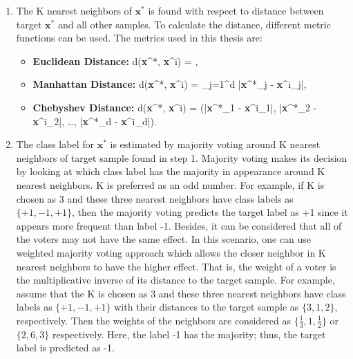 \begin{enumerate}
	\item The K nearest neighbors of $\textbf{x}^{*}$ is found with respect to distance between target $\textbf{x}^{*}$ and all other samples. To calculate the distance, different metric functions can be used. The metrics used in this thesis are:
	
	\begin{itemize}
		\item \textbf{Euclidean Distance:}
		\be
		\label{eucledian_distance}
		d(\textbf{x}^{*}, \textbf{x}^{i}) = \:,
		\ee
		
		\item \textbf{Manhattan Distance:}
		\be
		\label{manhattan_distance}
		d(\textbf{x}^{*}, \textbf{x}^{i}) = \sum_{j=1}^{d} |{\textbf{x}^{*}}_{j} - {\textbf{x}^{i}}_{j}|\:, \quad {}
		\ee
		
		\item \textbf{Chebyshev Distance:}
		\be
		\label{chebyshev_distance}
		d(\textbf{x}^{*}, \textbf{x}^{i}) = \max (|{\textbf{x}^{*}}_{1} - {\textbf{x}^{i}}_{1}|, |{\textbf{x}^{*}}_{2} - {\textbf{x}^{i}}_{2}|, \dots, |{\textbf{x}^{*}}_{d} - {\textbf{x}^{i}}_{d}|)\:.
		\ee
	\end{itemize}
	
	\item The class label for $\textbf{x}^{*}$ is estimated by majority voting around K nearest neighbors of target sample found in step 1. Majority voting makes its decision by looking at which class label has the majority in appearance around K nearest neighbors. K is preferred as an odd number. For example, if K is chosen as 3 and these three nearest neighbors have class labels as $\{+1, -1, +1\}$, then the majority voting predicts the target label as +1 since it appears more frequent than label -1. Besides, it can be considered that all of the voters may not have the same effect. In this scenario, one can use weighted majority voting approach which allows the closer neighbor in K nearest neighbors to have the higher effect. That is, the weight of a voter is the multiplicative inverse of its distance to the target sample. For example, assume that the K is chosen as 3 and these three nearest neighbors have class labels as $\{+1, -1, +1\}$ with their distances to the target sample as $\{3, 1, 2\}$, respectively. Then the weights of the neighbors are considered as $\{\frac{1}{3}, 1, \frac{1}{2}\}$ or $\{2, 6, 3\}$ respectively. Here, the label -1 has the majority; thus, the target label is predicted as -1.
\end{enumerate}

